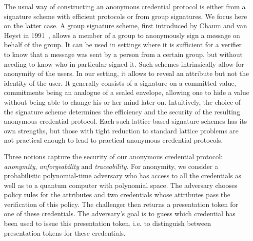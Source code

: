 	The usual way of constructing an anonymous credential protocol 
is either from a signature scheme with efficient protocols or from group 
signatures. We focus here on the latter case. A group signature scheme, 
first introduced by Chaum and van Heyst in 1991~\cite{EC:ChaVan91}, 
allows a member of a group to anonymously sign a message on behalf of 
the group. It can be used in settings where it is sufficient for a 
verifier to know that a message was sent by a person from a certain 
group, but without needing to know who in particular signed it. Such 
schemes intrinsically allow for anonymity of the users. In our setting, 
it allows to reveal an attribute but not the identity of the user. It 
generally consists of a signature on a committed value, commitments 
being an analogue of a sealed envelope, allowing one to hide a value 
without being able to change his or her mind later on. Intuitively, the 
choice of the signature scheme determines the efficiency and the 
security of the resulting anonymous credential protocol. Each such 
lattice-based signature schemes has its own strengths, but those with 
tight reduction to standard lattice problems are not practical enough to 
lead to practical anonymous credential protocols.




	Three notions capture the security of our anonymous credential 
	protocol: \emph{anonymity}, \emph{unforgeability} and \emph{traceability}. For anonymity, 
we consider a probabilistic polynomial-time adversary who has access to 
all the credentials as well as to a quantum computer with polynomial 
space. The adversary chooses policy rules for the attributes and two 
credentials whose attributes pass the verification of this policy. The 
challenger then returns a presentation token for one of these 
credentials. The adversary's goal is to guess which credential has been 
used to issue this presentation token, i.e. to distinguish between 
presentation tokens for these credentials. 


